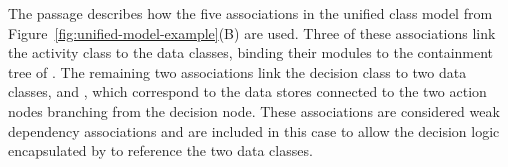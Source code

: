 The passage describes how the five associations in the unified class model from Figure~\ref{fig:unified-model-example}(B) are used. Three of these associations link the  activity class to the data classes, binding their modules to the containment tree of . The remaining two associations link the decision class  to two data classes,  and , which correspond to the data stores connected to the two action nodes branching from the decision node. These associations are considered weak dependency associations and are included in this case to allow the decision logic encapsulated by  to reference the two data classes.